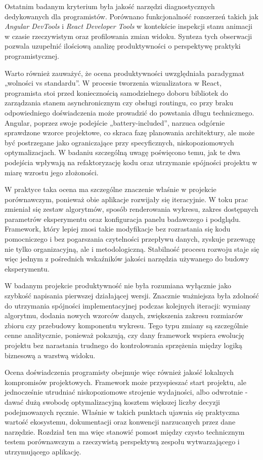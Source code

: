 \documentclass[12pt,openright,twoside]{report}
\begin{document}
Ostatnim badanym kryterium była jakość narzędzi diagnostycznych dedykowanych dla programistów. Porównano funkcjonalność rozszerzeń takich jak \textit{Angular DevTools} i \textit{React Developer Tools} w kontekście inspekcji stanu animacji w czasie rzeczywistym oraz profilowania zmian widoku. Synteza tych obserwacji pozwala uzupełnić ilościową analizę produktywności o perspektywę praktyki programistycznej.

Warto również zauważyć, że ocena produktywności uwzględniała paradygmat „wolności vs standardu”. W procesie tworzenia wizualizatora w React, programista stoi przed koniecznością samodzielnego doboru bibliotek do zarządzania stanem asynchronicznym czy obsługi routingu, co przy braku odpowiedniego doświadczenia może prowadzić do powstania długu technicznego. Angular, poprzez swoje podejście „battery-included”, narzuca odgórnie sprawdzone wzorce projektowe, co skraca fazę planowania architektury, ale może być postrzegane jako ograniczające przy specyficznych, niskopoziomowych optymalizacjach. W badaniu szczególną uwagę poświęcono temu, jak te dwa podejścia wpływają na refaktoryzację kodu oraz utrzymanie spójności projektu w miarę wzrostu jego złożoności.

W praktyce taka ocena ma szczególne znaczenie właśnie w projekcie porównawczym, ponieważ obie aplikacje rozwijały się iteracyjnie. W toku prac zmieniał się zestaw algorytmów, sposób renderowania wykresu, zakres dostępnych parametrów eksperymentu oraz konfiguracja panelu badawczego i podglądu. Framework, który lepiej znosi takie modyfikacje bez rozrastania się kodu pomocniczego i bez pogarszania czytelności przepływu danych, zyskuje przewagę nie tylko organizacyjną, ale i metodologiczną. Stabilność procesu rozwoju staje się więc jednym z pośrednich wskaźników jakości narzędzia używanego do budowy eksperymentu.

W badanym projekcie produktywność nie była rozumiana wyłącznie jako szybkość napisania pierwszej działającej wersji. Znacznie ważniejsza była zdolność do utrzymania spójności implementacyjnej podczas kolejnych iteracji: wymiany algorytmu, dodania nowych wzorców danych, zwiększenia zakresu rozmiarów zbioru czy przebudowy komponentu wykresu. Tego typu zmiany są szczególnie cenne analitycznie, ponieważ pokazują, czy dany framework wspiera ewolucję projektu bez narastania trudnego do kontrolowania sprzężenia między logiką biznesową a warstwą widoku.

Ocena doświadczenia programisty obejmuje więc również jakość lokalnych kompromisów projektowych. Framework może przyspieszać start projektu, ale jednocześnie utrudniać niskopoziomowe strojenie wydajności, albo odwrotnie - dawać dużą swobodę optymalizacyjną kosztem większej liczby decyzji podejmowanych ręcznie. Właśnie w takich punktach ujawnia się praktyczna wartość ekosystemu, dokumentacji oraz konwencji narzucanych przez dane narzędzie. Rozdział ten ma więc stanowić pomost między czysto technicznym testem porównawczym a rzeczywistą perspektywą zespołu wytwarzającego i utrzymującego aplikację.
\end{document}
